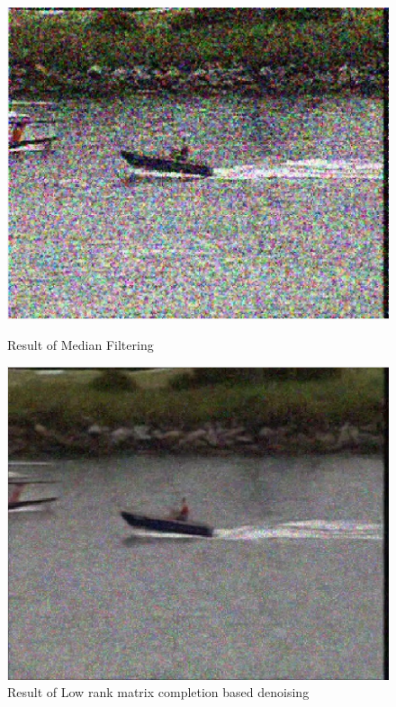 \documentclass{article}
\begin{document}
\begin{figure}[H]
    \centering
    \begin{minipage}{.45\textwidth}
        \centering
        \includegraphics[width=\linewidth]{Images/Coastguard_1_median_filter.png}
        \caption{Result of Median Filtering}
    \end{minipage}
    \begin{minipage}{.45\textwidth}
        \centering
        \includegraphics[width=\linewidth]{Images/Coastguard_1_denoised.png}
        \caption{Result of Low rank matrix completion based denoising}
    \end{minipage}
\end{figure}
\end{document}
